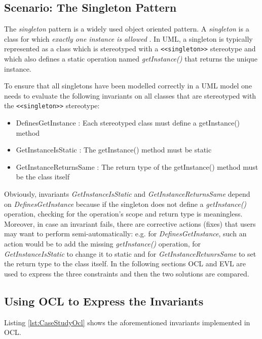 \subsection{Scenario: The Singleton Pattern}

The \emph{singleton} pattern is a widely used object oriented pattern. A \emph{singleton} is a class for which \emph{exactly one instance is allowed} \cite{Larman}. In UML, a singleton is typically represented as a class which is stereotyped with a \verb|<<singleton>>| stereotype and which also defines a static operation named \emph{getInstance()} that returns the unique instance. 

To ensure that all singletons have been modelled correctly in a UML model one needs to evaluate the following invariants on all classes that are stereotyped with the \verb|<<singleton>>| stereotype:

\begin{itemize}
	\item DefinesGetInstance : Each stereotyped class must define a getInstance() method
	\item GetInstanceIsStatic : The getInstance() method must be static
	\item GetInstanceReturnsSame : The return type of the getInstance() method must be the class itself 
\end{itemize}

Obviously, invariants \emph{GetInstanceIsStatic} and \emph{GetInstanceReturnsSame} depend on \emph{DefinesGetInstance} because if the singleton does not define a \emph{getInstance()} operation, checking for the operation's scope and return type is meaningless. Moreover, in case an invariant fails, there are corrective actions (fixes) that users may want to perform semi-automatically: e.g. for \emph{DefinesGetInstance}, such an action would be to add the missing \emph{getInstance()} operation, for \emph{GetInstanceIsStatic} to change it to static and for \emph{GetInstanceRetunrsSame} to set the return type to the class itself. In the following sections OCL and EVL are used to express the three constraints and then the two solutions are compared.

\subsection{Using OCL to Express the Invariants}

Listing \ref{lst:CaseStudyOcl} shows the aforementioned invariants implemented in OCL.

